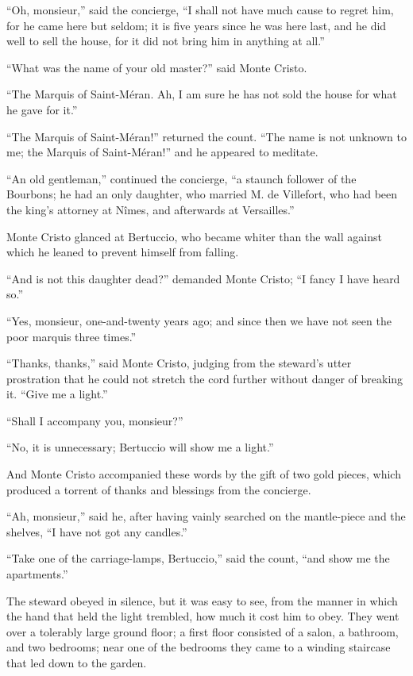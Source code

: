 “Oh, monsieur,” said the concierge, “I shall not have much cause to
regret him, for he came here but seldom; it is five years since he was
here last, and he did well to sell the house, for it did not bring him
in anything at all.”

“What was the name of your old master?” said Monte Cristo.

“The Marquis of Saint-Méran. Ah, I am sure he has not sold the house
for what he gave for it.”

“The Marquis of Saint-Méran!” returned the count. “The name is not
unknown to me; the Marquis of Saint-Méran!” and he appeared to
meditate.

“An old gentleman,” continued the concierge, “a staunch follower of the
Bourbons; he had an only daughter, who married M. de Villefort, who had
been the king’s attorney at Nîmes, and afterwards at Versailles.”

Monte Cristo glanced at Bertuccio, who became whiter than the wall
against which he leaned to prevent himself from falling.

“And is not this daughter dead?” demanded Monte Cristo; “I fancy I have
heard so.”

“Yes, monsieur, one-and-twenty years ago; and since then we have not
seen the poor marquis three times.”

“Thanks, thanks,” said Monte Cristo, judging from the steward’s utter
prostration that he could not stretch the cord further without danger
of breaking it. “Give me a light.”

“Shall I accompany you, monsieur?”

“No, it is unnecessary; Bertuccio will show me a light.”

And Monte Cristo accompanied these words by the gift of two gold
pieces, which produced a torrent of thanks and blessings from the
concierge.

“Ah, monsieur,” said he, after having vainly searched on the
mantle-piece and the shelves, “I have not got any candles.”

“Take one of the carriage-lamps, Bertuccio,” said the count, “and show
me the apartments.”

The steward obeyed in silence, but it was easy to see, from the manner
in which the hand that held the light trembled, how much it cost him to
obey. They went over a tolerably large ground floor; a first floor
consisted of a salon, a bathroom, and two bedrooms; near one of the
bedrooms they came to a winding staircase that led down to the garden.

